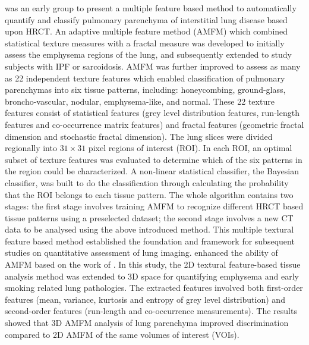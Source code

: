 \cite{uppaluri1999interstitial,uppaluri1999computer} was an early group to present a multiple feature based method to automatically quantify and classify pulmonary parenchyma of interstitial lung disease based upon HRCT. An adaptive multiple feature method (AMFM) which combined statistical texture measures with a fractal measure was developed to initially assess the emphysema regions of the lung, and subsequently extended to study subjects with IPF or sarcoidosis. AMFM was further improved to assess as many as 22 independent texture features which enabled classification of pulmonary parenchymas into six tissue patterns, including: honeycombing, ground-glass, broncho-vascular, nodular, emphysema-like, and normal. These 22 texture features consist of statistical features (grey level distribution features, run-length features and co-occurrence matrix features) and fractal features (geometric fractal dimension and stochastic fractal dimension). The lung slices were divided regionally into $31 \times 31$ pixel regions of interest (ROI). In each ROI, an optimal subset of texture features was evaluated to determine which of the six patterns in the region could be characterized. A non-linear statistical classifier, the Bayesian classifier, was built to do the classification through calculating the probability that the ROI belongs to each tissue pattern. The whole algorithm contains two stages: the first stage involves training AMFM to recognize different HRCT based tissue patterns using a preselected dataset; the second stage involves a new CT data to be analysed using the above introduced method. This multiple textural feature based method established the foundation and framework for subsequent studies on quantitative assessment of lung imaging. \cite{xu2006computer,xu2006mdct} enhanced the ability of AMFM based on the work of \cite{uppaluri1999interstitial,uppaluri1999computer}. In this study, the 2D textural feature-based tissue analysis method was extended to 3D space for quantifying emphysema and early smoking related lung pathologies. The extracted features involved both first-order features (mean, variance, kurtosis and entropy of grey level distribution) and second-order features (run-length and co-occurrence measurements). The results showed that 3D AMFM analysis of lung parenchyma improved discrimination compared to 2D AMFM of the same volumes of interest (VOIs). 

